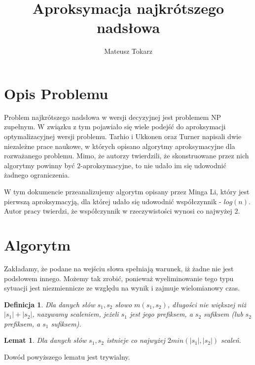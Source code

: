 \documentclass[12pt]{article}
\theoremstyle{plain}
\newtheorem*{df}{Definicja}
\newtheorem*{lemat}{Lemat}
\begin{document}
\title{Aproksymacja najkrótszego nadsłowa}
\author{Mateusz Tokarz}
\maketitle

\section*{Opis Problemu}
Problem najkrótszego nadsłowa w wersji decyzyjnej jest problemem NP zupełnym. W związku z tym pojawiało się wiele podejść do aproksymacji optymalizacyjnej wersji problemu. Tarhio i Ukkonen oraz Turner napisali dwie niezależne prace naukowe, w których opisano algorytmy aproksymacyjne dla rozważanego problemu. Mimo, że autorzy twierdzili, że skonstruowane przez nich algorytmy powinny być $2$-aproksymacyjne, to nie udało im się udowodnić żadnego ograniczenia. 


W tym dokumencie przeanalizujemy algorytm opisany przez Minga Li, który jest pierwszą aproksymacyją, dla której udało się udowodnić współczynnik - $log(n)$. Autor pracy twierdzi, że współczynnik w rzeczywistości wynosi co najwyżej $2$.
  
\section*{Algorytm}
Zakładamy, że podane na wejściu słowa spełniają warunek, iż żadne nie jest podsłowem innego. Możemy tak zrobić, ponieważ wyeliminowanie tego typu sytuacji jest niezmiennicze ze względu na wynik i zajmuje wielomianowy czas.
\newline 

\begin{df}
Dla danych słów $s_1, s_2$ słowo $m(s_1, s_2)$, długości nie większej niż $|s_1| + |s_2|$, nazywamy scaleniem, jeżeli $s_1$ jest jego prefiksem, a $s_2$ sufiksem (lub $s_2$ prefiksem, a $s_1$ sufiksem).
\end{df}
\bigskip

\begin{lemat}
Dla danych słów $s_1, s_2$ istnieje co najwyżej $2 min(|s_1|, |s_2|)$ scaleń.
\end{lemat}

Dowód powyższego lematu jest trywialny.
\newline
\end{document}
